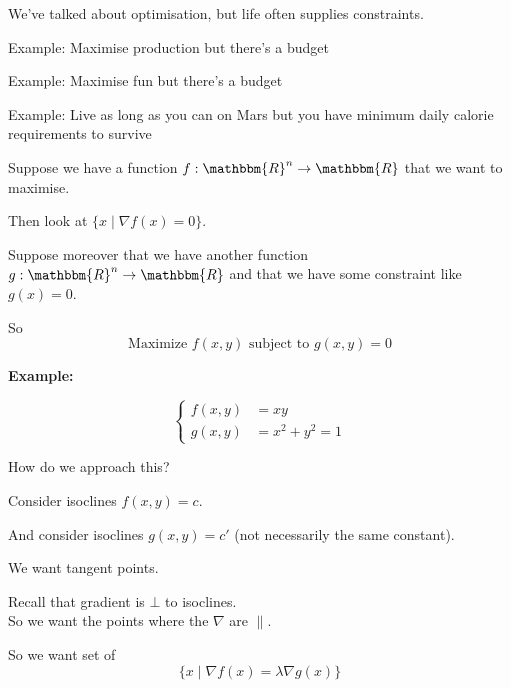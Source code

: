 
\usepackage{epsfig}
\usepackage{bbm}







We've talked about optimisation, but life often supplies constraints.

Example: Maximise production but there's a budget

Example: Maximise fun but there's a budget

Example: Live as long as you can on Mars but you have minimum daily
calorie requirements to survive

\bigskip

Suppose we have a function $f : \mathbbm{R}^n \rightarrow
\mathbbm{R}$ that we want to maximise.

Then look at $\{x\mid \nabla f(x) = 0 \}$.

\medskip

Suppose moreover that we have another function $g : \mathbbm{R}^n
\rightarrow \mathbbm{R}$ and that we have some constraint like
$g(x)=0$.

So
\begin{displaymath}
  \mbox{Maximize } f(x,y) \mbox{ subject to } g(x,y) = 0
\end{displaymath}

\textbf{Example:}

\begin{equation}
\begin{cases}
  f(x,y) & = xy \\
  g(x,y) & = x^2 + y^2 = 1
\end{cases}
\end{equation}

How do we approach this?

Consider isoclines $f(x,y) = c$.

And consider isoclines $g(x,y) = c'$ (not necessarily the same
constant).

We want tangent points.

Recall that gradient is $\bot$ to isoclines.\\
So we want the points where the $\nabla$ are $\parallel$.

So we want set of
\begin{displaymath}
  \{ x \mid \nabla f(x) = \lambda \nabla g(x) \}
\end{displaymath}

